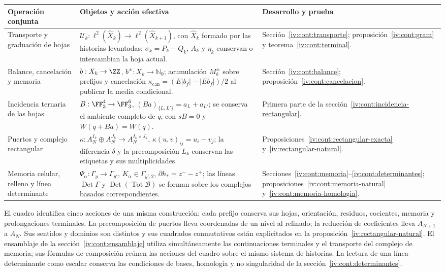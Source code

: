 \begin{center}
\small
\begin{tabular}{@{}p{.21\linewidth}p{.48\linewidth}p{.23\linewidth}@{}}
\toprule
Operación conjunta & Objetos y acción efectiva & Desarrollo y prueba\\
\midrule
Transporte y graduación de hojas
& \(\mathcal U_k:\ell^2(\widehat X_k)\to
\ell^2(\widehat X_{k+1})\), con \(\widehat X_k\) formado por
las historias levantadas; \(\sigma_k=P_k-Q_k\), \(A_k\) y
\(\eta_k\) conservan o intercambian la hoja actual.
& Sección~\ref{iv:cont:transporte}; proposición~\ref{iv:cont:gram}
y teorema~\ref{iv:cont:terminal}.\\[5pt]
Balance, cancelación y memoria
& \(b:X_k\to\ZZ\), \(b^\pm:X_k\to\mathbb N_0\);
acumulación \(M_k^\pm\) sobre prefijos y cancelación
\(\kappa_{\mathrm{can}}=(E|b_f|-|Eb_f|)/2\) al publicar
la media condicional.
& Sección~\ref{iv:cont:balance};
proposición~\ref{iv:cont:cancelacion}.\\[5pt]
Incidencia ternaria de las hojas
& \(B:\FF_3^4\to\FF_3^6\),
\((Ba)_{\{L,L'\}}=a_L+a_{L'}\); se conserva el ambiente
completo de \(q\), con \(sB=0\) y \(W(q+Ba)=W(q)\).
& Primera parte de la
sección~\ref{iv:cont:incidencia-rectangular}.\\[5pt]
Puertos y complejo rectangular
& \(\kappa:A_N^{I_k}\oplus A_N^{J_k}\to
A_N^{I_k\times J_k}\), \(\kappa(u,v)_{ij}=u_i-v_j\);
la diferencia \(\delta\) y la precomposición \(L_k\)
conservan las etiquetas y sus multiplicidades.
& Proposiciones~\ref{iv:cont:rectangular-exacta}
y~\ref{iv:rectangular-natural}.\\[5pt]
Memoria celular, relleno y línea determinante
& \(\Psi_\alpha:\Gamma_y\to\Gamma_{y'}\),
\(K_\alpha\in\Gamma_{y',2}\),
\(\partial h_*=z^--z^+\); las líneas
\(\operatorname{Det}\Gamma\) y
\(\operatorname{Det}(\operatorname{Tot}\mathcal B)\)
se forman sobre los complejos basados correspondientes.
& Secciones~\ref{iv:cont:memoria}--\ref{iv:cont:determinantes};
proposiciones~\ref{iv:cont:memoria-natural}
y~\ref{iv:cont:memoria-homologia}.\\
\bottomrule
\end{tabular}
\end{center}

El cuadro identifica cinco acciones de una misma construcción: cada
prefijo conserva sus hojas, orientación, residuos, cocientes, memoria
y prolongaciones terminales. La precomposición de puertos lleva
coordenadas de un nivel al refinado; la reducción de coeficientes
lleva \(A_{N+1}\) a \(A_N\). Sus sentidos y dominios son
distintos y sus cuadrados conmutativos están explicitados en la
proposición~\ref{iv:rectangular-natural}. El ensamblaje de la
sección~\ref{iv:cont:ensamblaje} utiliza simultáneamente las
continuaciones terminales y el transporte del complejo de memoria;
sus fórmulas de composición reúnen las acciones del cuadro sobre el
mismo sistema de historias. La lectura de una línea determinante
como escalar conserva las condiciones de bases, homología y
no singularidad de la sección~\ref{iv:cont:determinantes}.

